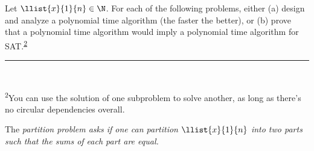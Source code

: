 \documentclass{article}
\begin{document}
\setcounter{section}{11}
\setcounter{exercise}{5}

 Let \( \llist{x}{1}{n}\in \N \).
For each of the following problems, either (a) design and analyze a polynomial time algorithm (the faster the better), or (b) prove that a polynomial time algorithm would imply a polynomial time algorithm for SAT.\textsuperscript{\hyperref[fn:sat]{2}} \\
\noindent\rule{2in}{0.4pt} \\
\parbox{\linewidth}{\small \textsuperscript{\label{fn:sat}2}You can use the solution of one subproblem to solve another, as long as there's no circular dependencies overall.}


\begin{subexercise}\label{qs:ptn}
  The \it{partition problem} asks if one can partition \( \llist{x}{1}{n} \) into two parts such that the sums of each part are equal.
\end{subexercise}
\end{document}
